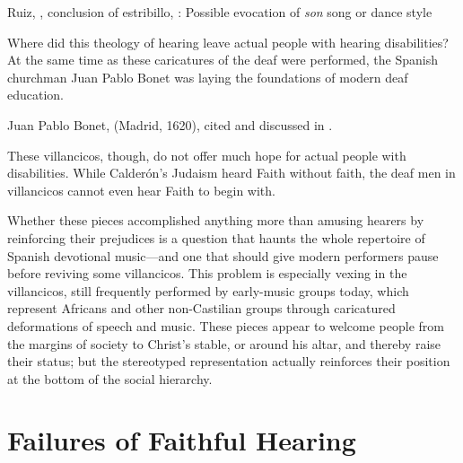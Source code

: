 \begin{musicexample}
    \caption{Ruiz, , conclusion of estribillo,
    : Possible evocation of \emph{son} song or dance style}

    \label{music:Ruiz-Sordos-son}
\end{musicexample}

Where did this theology of hearing leave actual people with hearing
disabilities? 
At the same time as these caricatures of the deaf were performed, the Spanish
churchman Juan Pablo Bonet was laying the foundations of modern deaf education.%
\begin{Footnote}
    Juan Pablo Bonet,  (Madrid, 1620), cited and discussed in
    \autocite{Plann:DeafEducationSpain}.  
\end{Footnote}
These villancicos, though, do not offer much hope for actual people with
disabilities.
While Calderón's Judaism heard Faith without faith, the deaf men in villancicos
cannot even hear Faith to begin with.

Whether these pieces accomplished anything more than amusing hearers by
reinforcing their prejudices is a question that haunts the whole repertoire of
Spanish devotional music---and one that should give modern performers pause
before reviving some villancicos.%
    \Autocite[7]{Cashner:WLSCM32}
This problem is especially vexing in the  villancicos, still
frequently performed by early-music groups today, which represent Africans and
other non-Castilian groups through caricatured deformations of speech and
music.%
    \Autocites{Baker:EthnicVC}{Baker:PerformancePostColonial}
These pieces appear to welcome people from the margins of society to Christ's
stable, or around his altar, and thereby raise their status; but the stereotyped
representation actually reinforces their position at the bottom of the social
hierarchy.

\section{Failures of Faithful Hearing}

